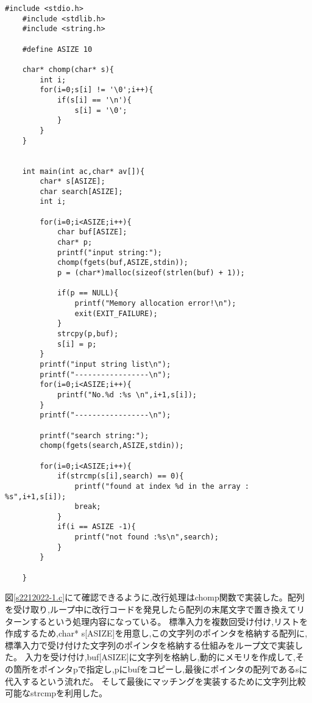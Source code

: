 \documentclass[fontsize = 10pt, paper= a4,twocolumn,column_gap=3zw]{jlreq}
\begin{document}
\begin{lstlisting}[basicstyle=\ttfamily\footnotesize, frame=single, caption=s2212022-1.c ,label=s2212022-1.c]
    #include <stdio.h>
    #include <stdlib.h>
    #include <string.h>
    
    #define ASIZE 10
    
    char* chomp(char* s){
        int i;
        for(i=0;s[i] != '\0';i++){
            if(s[i] == '\n'){
                s[i] = '\0';
            }
        }
    }
    
    
    int main(int ac,char* av[]){
        char* s[ASIZE];
        char search[ASIZE];
        int i;
        
        for(i=0;i<ASIZE;i++){
            char buf[ASIZE];
            char* p;
            printf("input string:");
            chomp(fgets(buf,ASIZE,stdin));
            p = (char*)malloc(sizeof(strlen(buf) + 1));
        
            if(p == NULL){
                printf("Memory allocation error!\n");
                exit(EXIT_FAILURE);
            }
            strcpy(p,buf);
            s[i] = p;
        }
        printf("input string list\n");
        printf("-----------------\n");
        for(i=0;i<ASIZE;i++){
            printf("No.%d :%s \n",i+1,s[i]);
        }
        printf("-----------------\n");
        
        printf("search string:");
        chomp(fgets(search,ASIZE,stdin));
    
        for(i=0;i<ASIZE;i++){
            if(strcmp(s[i],search) == 0){
                printf("found at index %d in the array : %s",i+1,s[i]);
                break;
            }
            if(i == ASIZE -1){
                printf("not found :%s\n",search);
            }
        }
        
    }
\end{lstlisting}

図\ref{s2212022-1.c}にて確認できるように,改行処理はchomp関数で実装した。配列を受け取り,ループ中に改行コードを発見したら配列の末尾文字で置き換えてリターンするという処理内容になっている。
標準入力を複数回受け付け,リストを作成するため,char* s[ASIZE]を用意し,この文字列のポインタを格納する配列に,標準入力で受け付けた文字列のポインタを格納する仕組みをループ文で実装した。
入力を受け付け,buf[ASIZE]に文字列を格納し,動的にメモリを作成して,その箇所をポインタpで指定し,pにbufをコピーし,最後にポインタの配列であるsに代入するという流れだ。
そして最後にマッチングを実装するために文字列比較可能なstrcmpを利用した。
\end{document}
